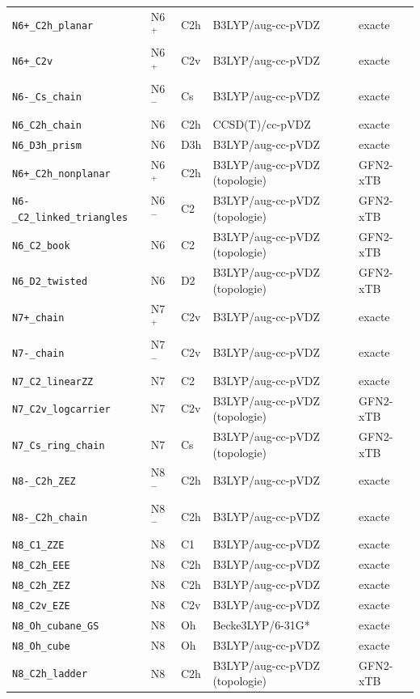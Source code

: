 \begin{longtable}{@{}p{4.4cm}p{1.3cm}p{1.2cm}p{4.1cm}p{1.9cm}@{}}
\texttt{N6+\_C2h\_planar} & N6$^{+}$ & C2h & B3LYP/aug-cc-pVDZ & exacte \\
\texttt{N6+\_C2v} & N6$^{+}$ & C2v & B3LYP/aug-cc-pVDZ & exacte \\
\texttt{N6-\_Cs\_chain} & N6$^{-}$ & Cs & B3LYP/aug-cc-pVDZ & exacte \\
\texttt{N6\_C2h\_chain} & N6 & C2h & CCSD(T)/cc-pVDZ & exacte \\
\texttt{N6\_D3h\_prism} & N6 & D3h & B3LYP/aug-cc-pVDZ & exacte \\
\texttt{N6+\_C2h\_nonplanar} & N6$^{+}$ & C2h & B3LYP/aug-cc-pVDZ (topologie) & GFN2-xTB \\
\texttt{N6-\_C2\_linked\_triangles} & N6$^{-}$ & C2 & B3LYP/aug-cc-pVDZ (topologie) & GFN2-xTB \\
\texttt{N6\_C2\_book} & N6 & C2 & B3LYP/aug-cc-pVDZ (topologie) & GFN2-xTB \\
\texttt{N6\_D2\_twisted} & N6 & D2 & B3LYP/aug-cc-pVDZ (topologie) & GFN2-xTB \\
\texttt{N7+\_chain} & N7$^{+}$ & C2v & B3LYP/aug-cc-pVDZ & exacte \\
\texttt{N7-\_chain} & N7$^{-}$ & C2v & B3LYP/aug-cc-pVDZ & exacte \\
\texttt{N7\_C2\_linearZZ} & N7 & C2 & B3LYP/aug-cc-pVDZ & exacte \\
\texttt{N7\_C2v\_logcarrier} & N7 & C2v & B3LYP/aug-cc-pVDZ (topologie) & GFN2-xTB \\
\texttt{N7\_Cs\_ring\_chain} & N7 & Cs & B3LYP/aug-cc-pVDZ (topologie) & GFN2-xTB \\
\texttt{N8-\_C2h\_ZEZ} & N8$^{-}$ & C2h & B3LYP/aug-cc-pVDZ & exacte \\
\texttt{N8-\_C2h\_chain} & N8$^{-}$ & C2h & B3LYP/aug-cc-pVDZ & exacte \\
\texttt{N8\_C1\_ZZE} & N8 & C1 & B3LYP/aug-cc-pVDZ & exacte \\
\texttt{N8\_C2h\_EEE} & N8 & C2h & B3LYP/aug-cc-pVDZ & exacte \\
\texttt{N8\_C2h\_ZEZ} & N8 & C2h & B3LYP/aug-cc-pVDZ & exacte \\
\texttt{N8\_C2v\_EZE} & N8 & C2v & B3LYP/aug-cc-pVDZ & exacte \\
\texttt{N8\_Oh\_cubane\_GS} & N8 & Oh & Becke3LYP/6-31G* & exacte \\
\texttt{N8\_Oh\_cube} & N8 & Oh & B3LYP/aug-cc-pVDZ & exacte \\
\texttt{N8\_C2h\_ladder} & N8 & C2h & B3LYP/aug-cc-pVDZ (topologie) & GFN2-xTB \\

\end{longtable}
